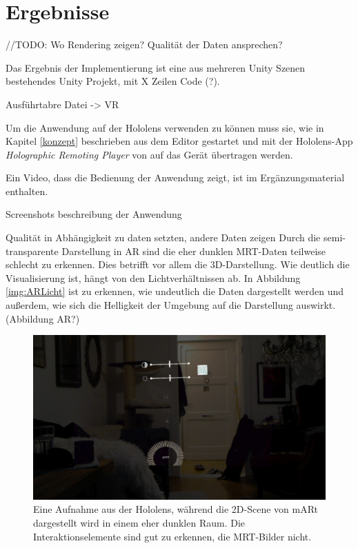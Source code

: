 

\chapter{Ergebnisse}
\label{ergebnisse}

//TODO:
Wo Rendering zeigen? Qualität der Daten ansprechen?

Das Ergebnis der Implementierung ist eine aus mehreren Unity Szenen bestehendes Unity Projekt, mit X Zeilen Code (?). 

Ausführtabre Datei -> VR

Um die Anwendung auf der Hololens verwenden zu können muss sie, wie in Kapitel \ref{konzept} beschrieben aus dem Editor gestartet und mit der Hololens-App \textit{Holographic Remoting Player} von auf das Gerät übertragen werden. 



Ein Video, dass die Bedienung der Anwendung zeigt, ist im Ergänzungsmaterial enthalten.

Screenshots
beschreibung der Anwendung

Qualität in Abhängigkeit zu daten setzten, andere Daten zeigen
Durch die semi-transparente Darstellung in AR sind die eher dunklen MRT-Daten teilweise schlecht zu erkennen. Dies betrifft vor allem die 3D-Darstellung. Wie deutlich die Visualisierung ist, hängt von den Lichtverhältnissen ab. In Abbildung \ref{img:ARLicht} ist zu erkennen, wie undeutlich die Daten dargestellt werden und außerdem, wie sich die Helligkeit der Umgebung auf die Darstellung auswirkt. (Abbildung AR?)


\begin{figure}
	\centering
	\includegraphics[width=0.5\linewidth]{images/hololens2D.jpg}
	\caption{Eine Aufnahme aus der Hololens, während die 2D-Scene von mARt dargestellt wird in einem eher dunklen Raum. Die Interaktionselemente sind gut zu erkennen, die MRT-Bilder nicht.}
	\label{img:mri}
\end{figure}

